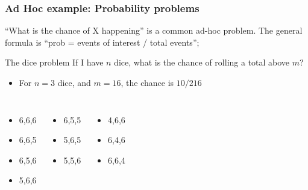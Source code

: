 \documentclass{beamer}
\begin{document}
\begin{frame}
  \frametitle{Ad Hoc example: Probability problems}

  {\smaller 
    ``What is the chance of X happening'' is a common ad-hoc
    problem. The general formula is ``prob = events of interest /
    total events'';
    
    \medskip

    \begin{block}{The dice problem}
      If I have $n$ dice, what is the chance of rolling a total above $m$?
    \end{block}

    \begin{itemize}
    \item {} For $n=3$ dice, and $m=16$, the chance is $10/216$
    \end{itemize}
    \begin{columns}
      \begin{itemize}
      \item 6,6,6
      \item 6,6,5
      \item 6,5,6
      \item 5,6,6
      \end{itemize}
      \begin{itemize}
      \item 6,5,5
      \item 5,6,5
      \item 5,5,6
      \end{itemize}
      \begin{itemize}
      \item 4,6,6
      \item 6,4,6
      \item 6,6,4
      \end{itemize}
    \end{columns}


  }
\end{frame}
\end{document}
